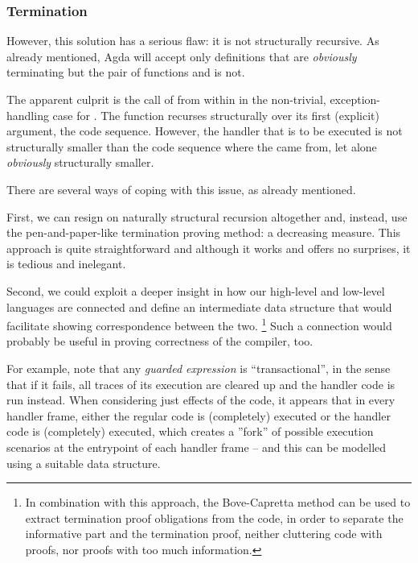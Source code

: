 \subsubsection{Termination}

However, this solution has a serious flaw: it is not structurally recursive.
As already mentioned, Agda will accept only definitions that are \emph{obviously}
terminating but the pair of functions  and 
is not.

The apparent culprit is the call of  from within
 in the non-trivial, exception-handling case for
. The function  recurses structurally over its
first (explicit) argument, the code sequence. However, the handler that is to
be executed is not structurally smaller than the code sequence where the
 came from, let alone \emph{obviously} structurally smaller.

There are several ways of coping with this issue, as already mentioned.

First, we can resign on naturally structural recursion altogether and, instead,
use the pen-and-paper-like termination proving method: a decreasing measure.
This approach is quite straightforward and although it works and offers no
surprises, it is tedious and inelegant.

Second, we could exploit a deeper insight in how our high-level and low-level
languages are connected and define an intermediate data structure that would
facilitate showing correspondence between the two.%
\footnote{In combination with this approach, the Bove-Capretta method can be used to
extract termination proof obligations from the code, in order to separate the
informative part and the termination proof, neither cluttering code with
proofs, nor proofs with too much information.} Such a connection would probably
be useful in proving correctness of the compiler, too.


For example, note that any \emph{guarded expression} is
``transactional'', in the sense that if it fails, all traces of its execution
are cleared up and the handler code is run instead. When considering just
effects of the code, it appears that in every handler frame, either the regular
code is (completely) executed or the handler code is (completely) executed,
which creates a ''fork'' of possible execution scenarios at the entrypoint of
each handler frame -- and this can be modelled using a suitable data structure.

